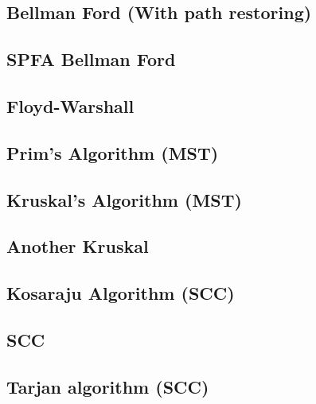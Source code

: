\documentclass[10pt]{article}
\begin{document}
\begin{multicols*}{2}
\subsection{Bellman Ford (With path restoring)}


\subsection{SPFA Bellman Ford}



\subsection{Floyd-Warshall}


\subsection{Prim's Algorithm (MST)}


\subsection{Kruskal's Algorithm (MST)}


\subsection{Another Kruskal}


\subsection{Kosaraju Algorithm (SCC)}


\subsection{SCC}


\subsection{Tarjan algorithm (SCC)}



\end{multicols*}
\end{document}
